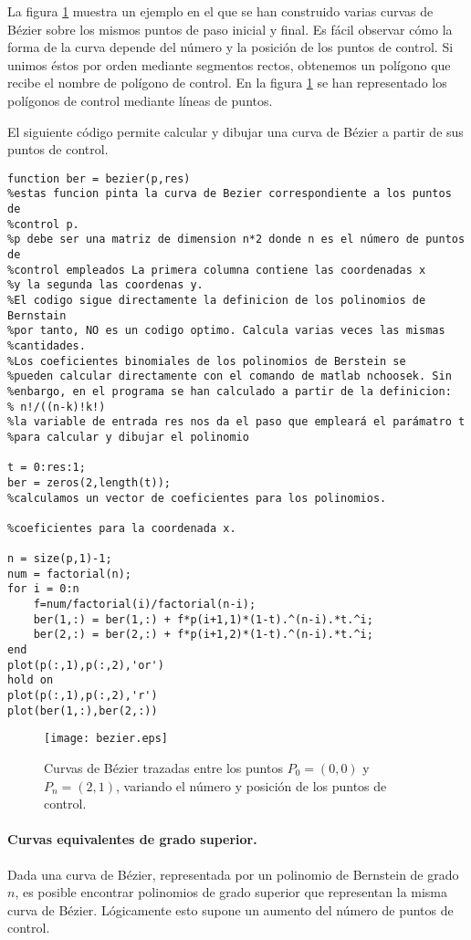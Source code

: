 La figura \ref{fig:bezier} muestra un ejemplo en el que se han construido varias curvas de Bézier sobre los mismos puntos de paso inicial y final. Es fácil observar cómo la forma de la curva depende del número y la posición de los puntos de control. Si unimos éstos por orden mediante segmentos rectos, obtenemos un polígono que recibe el nombre de polígono de control. En la figura \ref{fig:bezier} se han representado los polígonos de control mediante líneas de puntos.

El siguiente código permite calcular y dibujar una curva de Bézier a partir de sus puntos de control.
\begin{verbatim}
function ber = bezier(p,res)
%estas funcion pinta la curva de Bezier correspondiente a los puntos de 
%control p. 
%p debe ser una matriz de dimension n*2 donde n es el número de puntos de 
%control empleados La primera columna contiene las coordenadas x 
%y la segunda las coordenas y.
%El codigo sigue directamente la definicion de los polinomios de Bernstain
%por tanto, NO es un codigo optimo. Calcula varias veces las mismas
%cantidades.
%Los coeficientes binomiales de los polinomios de Berstein se 
%pueden calcular directamente con el comando de matlab nchoosek. Sin 
%enbargo, en el programa se han calculado a partir de la definicion:
% n!/((n-k)!k!)
%la variable de entrada res nos da el paso que empleará el parámatro t
%para calcular y dibujar el polinomio

t = 0:res:1;
ber = zeros(2,length(t));
%calculamos un vector de coeficientes para los polinomios.

%coeficientes para la coordenada x.

n = size(p,1)-1;
num = factorial(n);
for i = 0:n    
    f=num/factorial(i)/factorial(n-i);
    ber(1,:) = ber(1,:) + f*p(i+1,1)*(1-t).^(n-i).*t.^i;
    ber(2,:) = ber(2,:) + f*p(i+1,2)*(1-t).^(n-i).*t.^i;
end
plot(p(:,1),p(:,2),'or')
hold on
plot(p(:,1),p(:,2),'r')
plot(ber(1,:),ber(2,:))
\end{verbatim}

\begin{figure}[h]
\centering
\texttt{[image: bezier.eps]} 
\caption{Curvas de Bézier trazadas entre los puntos $P_0 = (0,0)$ y $P_n = (2,1)$, variando el número y posición de los puntos de control.} 
\label{fig:bezier}
\end{figure}

\paragraph{Curvas equivalentes de grado superior.} Dada una curva de Bézier, representada por un polinomio de Bernstein de grado $n$, es posible encontrar polinomios de grado superior que representan la misma curva de Bézier. Lógicamente esto supone un aumento del número de puntos de control.

